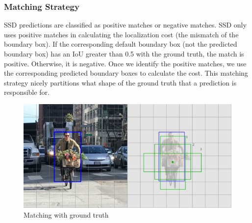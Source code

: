         \subsubsection{Matching Strategy}
            SSD predictions are classified as positive matches or negative matches. SSD only uses positive matches in calculating the localization cost (the mismatch of the boundary box). If the corresponding default boundary box (not the predicted boundary box) has an IoU greater than 0.5 with the ground truth, the match is positive. Otherwise, it is negative. Once we identify the positive matches, we use the corresponding predicted boundary boxes to calculate the cost. This matching strategy nicely partitions what shape of the ground truth that a prediction is responsible for.
            \begin{figure}[H]
                \centering
                \includegraphics[width=0.6\linewidth]{img/matching.png}
                \caption{Matching with ground truth}
            \end{figure}
